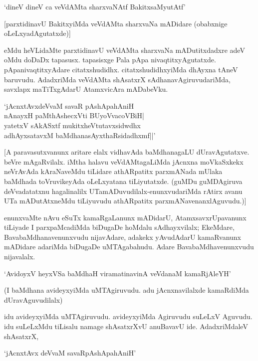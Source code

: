 \begin{shloka}
`dineV dineV ca veVdAMta sharxvaNAtf BakitxsaMyutAtf'
\end{shloka}

[parxtidinavU BakitxyiMda veVdAMta sharxvaNa mADidare (obabxnige oLeLxyadAgutatxde)]

eMdu heVLidaMte parxtidinavU veVdAMta sharxvaNa mADutitxdadxre adeV oMdu doDaDx tapasusx. tapasisxge Pala pApa nivaqtitxyAgutatxde. pApanivaqtitxyAdare citatxshudidhx. citatxshudidhxyiMda dhAyxna tAneV baruvudu. AdadxriMda veVdAMta shAsatxrX sAdhanavAgiruvudariMda, savxlapx maTiTxgAdarU AtamxvicAra mADabeVku.

\begin{shloka}
`jAcnxtAvxdeVvaM savaR pAshApahAniH\\
nAnayxH paMthAshecxVti BUyoVvacoVBiH|\\
yatetxV sAkASxtf mukitxheVtutavxsidwdhx\\
adhAyxsatavxM baMdhanasAyxthaRsidadhxmf||'
\end{shloka}

[A paravasutxvanunx aritare elalx vidhavAda baMdhanagaLU dUravAgutatxve. beVre mAgaRvilalx. iMtha halavu veVdAMtagaLiMda jAcnxna moVkaSxkekx neVrAvAda kAraNaveMdu tiLidare athARpatitx parxmANada mUlaka baMdhada toVruvikeyAda oLeLxyatana tiLiyutatxde. (guMDu guMDAgiruva deVvadatatxnu hagalinalilx UTamADuvudilalx-enunxvudariMda rAtirx avanu UTa mADutAtxneMdu tiLiyuvudu athARpatitx parxmANavenanxlAguvudu.)]

enunxvaMte nAvu eSuTx kamaRgaLanunx mADidarU, AtamxsavxrUpavanunx tiLiyade I parxpaMcadiMda biDugaDe hoMdalu sAdhayxvilalx; EkeMdare, BavabaMdhanavenunxvudu nijavAdare, adakekx yAvudAdarU kamaRvanunx mADidare adariMda biDugaDe uMTAgabahudu. Adare BavabaMdhavenunxvudu nijavalalx.

\begin{shloka}
`AvidoyxV heyxVSa baMdhaH viramatinavinA veVdanaM kamaRjAleYH'
\end{shloka}

(I baMdhana avideyxyiMda uMTAgiruvudu. adu jAcnxnavilalxde kamaRdiMda dUravAguvudilalx)

idu avideyxyiMda uMTAgiruvudu. avideyxyiMda Agiruvudu suLeLxV Aguvudu. idu suLeLxMdu tiLisalu namage shAsatxrXvU anuBavavU ide. AdadxriMdaleV shAsatxrX,

\begin{shloka}
`jAcnxtAvx deVvaM savaRpAshApahAniH'
\end{shloka}

